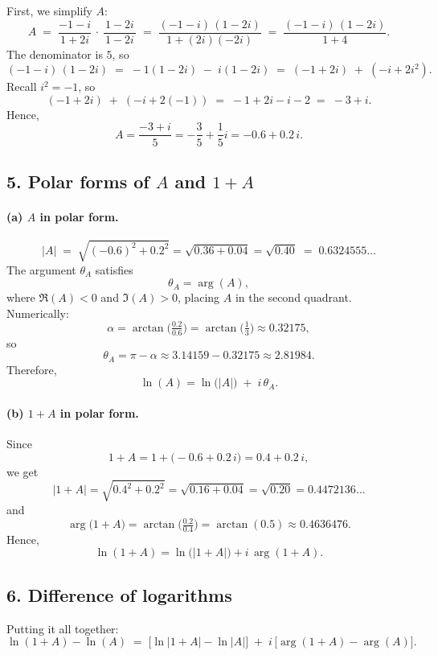 \documentclass[12pt]{article}
\theoremstyle{definition} %
\theoremstyle{plain} %
\begin{document}
First, we simplify $A$:
\[
A 
\;=\;
\frac{-1 - i}{\,1 + 2i\,}
\,\cdot\,
\frac{1 - 2i}{\,1 - 2i\,}
\;=\;
\frac{(-1 - i)\,(1 - 2i)}{\,1 + (2i)(-2i)\,}
\;=\;
\frac{(-1 - i)\,(1 - 2i)}{1 + 4}.
\]
The denominator is $5$, so
\[
(-1 - i)\,(1 - 2i)
\;=\;
-1(1 - 2i)\;-\;i(1 - 2i)
\;=\;
(-1 + 2i)\;+\;(-i + 2i^2).
\]
Recall $i^2 = -1$, so
\[
(-1 + 2i)\;+\;(-i + 2(-1))
\;=\;
-1 + 2i - i - 2
\;=\;
-3 + i.
\]
Hence,
\[
A = \frac{-3 + i}{5} 
= -\frac{3}{5} + \frac{1}{5}i
= -0.6 + 0.2\,i.
\]

\subsection*{5. Polar forms of $A$ and $1+A$}

\paragraph{(a) $A$ in polar form.}

\[
\lvert A\rvert 
\;=\;
\sqrt{(-0.6)^2 + 0.2^2} 
= \sqrt{0.36 + 0.04}
= \sqrt{0.40}
\;=\;
0.6324555\ldots
\]
The argument $\theta_A$ satisfies
\[
\theta_A = \arg(A),
\]
where $\Re(A) < 0$ and $\Im(A) > 0$, placing $A$ in the second quadrant. Numerically:
\[
\alpha = \arctan\!\bigl(\tfrac{0.2}{0.6}\bigr)
= \arctan\!\bigl(\tfrac{1}{3}\bigr) 
\approx 0.32175,
\]
so
\[
\theta_A = \pi - \alpha
\approx 3.14159 - 0.32175 
\approx 2.81984.
\]
Therefore,
\[
\ln(A)
= \ln\!\bigl(\lvert A\rvert\bigr) \;+\; i\,\theta_A.
\]

\paragraph{(b) $1 + A$ in polar form.}

Since
\[
1 + A 
= 1 + \bigl(-0.6 + 0.2\,i\bigr)
= 0.4 + 0.2\,i,
\]
we get
\[
\lvert 1 + A\rvert
= \sqrt{0.4^2 + 0.2^2}
= \sqrt{0.16 + 0.04}
= \sqrt{0.20}
= 0.4472136\ldots
\]
and
\[
\arg\bigl(1 + A\bigr) 
= \arctan\!\bigl(\tfrac{0.2}{0.4}\bigr)
= \arctan(0.5)
\approx 0.4636476.
\]
Hence,
\[
\ln(1 + A)
= \ln\!\bigl(\lvert 1 + A\rvert\bigr)
+ i\,\arg(1 + A).
\]

\subsection*{6. Difference of logarithms}

Putting it all together:
\[
\ln(1 + A) - \ln(A)
\;=\;
\bigl[\ln\lvert 1 + A\rvert - \ln\lvert A\rvert\bigr]
\;+\;
i\,\bigl[\arg(1 + A) - \arg(A)\bigr].
\]
\end{document}
